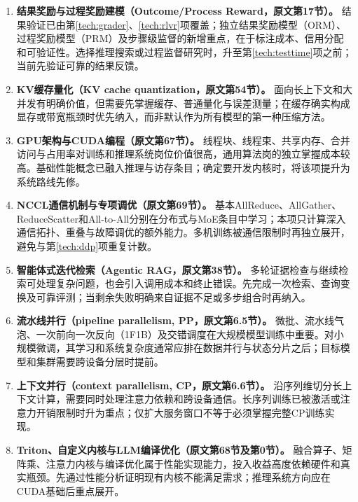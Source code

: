 \documentclass[UTF8,12pt,a4paper,fontset=fandol]{ctexart}
\begin{document}
\begin{enumerate}[resume=techrank]
\item \textbf{结果奖励与过程奖励建模（Outcome/Process Reward，原文第17节）。}\label{tech:process}
结果验证已由第\ref{tech:grader}、\ref{tech:rlvr}项覆盖；独立结果奖励模型（ORM）、过程奖励模型（PRM）及步骤级监督的新增重点，在于标注成本、信用分配和可验证性。选择推理搜索或过程监督研究时，升至第\ref{tech:testtime}项之前；当前先验证可靠的结果反馈。

\item \textbf{KV缓存量化（KV cache quantization，原文第54节）。}\label{tech:kvquant}
面向长上下文和大并发有明确价值，但需要先掌握缓存、普通量化与误差测量；在缓存确实构成显存或带宽瓶颈时优先纳入，而非默认作为所有模型的第一种压缩方法。

\item \textbf{GPU架构与CUDA编程（原文第67节）。}\label{tech:cuda}
线程块、线程束、共享内存、合并访问与占用率对训练和推理系统岗位价值很高，通用算法岗的独立掌握成本较高。基础性能概念已融入推理与访存条目；确定要开发内核时，将该项提升为系统路线先修。

\item \textbf{NCCL通信机制与专项调优（原文第69节）。}\label{tech:nccl}
基本AllReduce、AllGather、ReduceScatter和All-to-All分别在分布式与MoE条目中学习；本项只计算深入通信拓扑、重叠与故障调优的额外能力。多机训练被通信限制时再独立展开，避免与第\ref{tech:ddp}项重复计数。

\item \textbf{智能体式迭代检索（Agentic RAG，原文第38节）。}\label{tech:agenticrag}
多轮证据检查与继续检索可处理复杂问题，也会引入调用成本和终止错误。先完成一次检索、查询变换及可靠评测；当剩余失败明确来自证据不足或多步组合时再纳入。

\item \textbf{流水线并行（pipeline parallelism, PP，原文第6.5节）。}\label{tech:pp}
微批、流水线气泡、一次前向一次反向（1F1B）及交错调度在大规模模型训练中重要。对小规模微调，其学习和系统复杂度通常应排在数据并行与状态分片之后；目标模型和集群需要跨设备分层时提前。

\item \textbf{上下文并行（context parallelism, CP，原文第6.6节）。}\label{tech:cp}
沿序列维切分长上下文计算，需要同时处理注意力依赖和跨设备通信。长序列训练已被激活或注意力开销限制时升为重点；仅扩大服务窗口不等于必须掌握完整CP训练实现。

\item \textbf{Triton、自定义内核与LLM编译优化（原文第68节及第0节）。}\label{tech:kernel}
融合算子、矩阵乘、注意力内核与编译优化属于性能实现能力，投入收益高度依赖硬件和真实瓶颈。先通过性能分析证明现有内核不能满足需求；推理系统方向应在CUDA基础后重点展开。


\end{enumerate}
\end{document}
